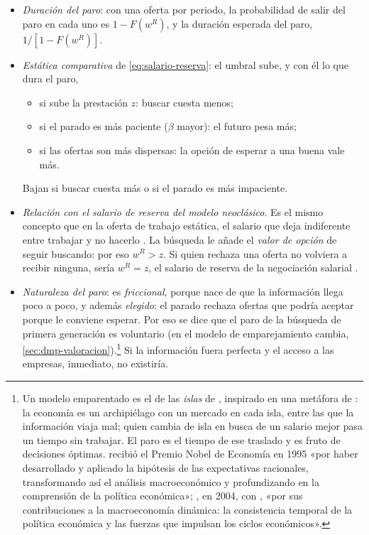 \documentclass[11pt]{article}
\begin{document}
\begin{itemize}
\item \emph{Duración del paro}: con una oferta por periodo, la probabilidad de salir del paro en cada uno es $1-F(w^R)$, y la duración esperada del paro, $1/[1-F(w^R)]$.
\item \emph{Estática comparativa} de \eqref{eq:salario-reserva}: el umbral sube, y con él lo que dura el paro,
  \begin{itemize}
  \item si sube la prestación $z$: buscar cuesta menos;
  \item si el parado es más paciente ($\beta$ mayor): el futuro pesa más;
  \item si las ofertas son más dispersas: la opción de esperar a una buena vale más.
  \end{itemize}
  Bajan si buscar cuesta más o si el parado es más impaciente.
\item \emph{Relación con el salario de reserva del modelo neoclásico}. Es el mismo concepto que en la oferta de trabajo estática, el salario que deja indiferente entre trabajar y no hacerlo . La búsqueda le añade el \emph{valor de opción} de seguir buscando: por eso $w^R>z$. Si quien rechaza una oferta no volviera a recibir ninguna, sería $w^R=z$, el salario de reserva de la negociación salarial .
\item \emph{Naturaleza del paro}: es \emph{friccional}, porque nace de que la información llega poco a poco, y además \emph{elegido}: el parado rechaza ofertas que podría aceptar porque le conviene esperar. Por eso se dice que el paro de la búsqueda de primera generación es voluntario (en el modelo de emparejamiento cambia, \ref{sec:dmp-valoracion}).\footnote{Un modelo emparentado es el de las \emph{islas} de \textcite{LucasPrescott1974Equilibrium}, inspirado en una metáfora de : la economía es un archipiélago con un mercado en cada isla, entre las que la información viaja mal; quien cambia de isla en busca de un salario mejor pasa un tiempo sin trabajar. El paro es el tiempo de ese traslado y es fruto de decisiones óptimas.  recibió el Premio Nobel de Economía en 1995 «por haber desarrollado y aplicado la hipótesis de las expectativas racionales, transformando así el análisis macroeconómico y profundizando en la comprensión de la política económica»\nocite{Nobel1995Lucas}; , en 2004, con , «por sus contribuciones a la macroeconomía dinámica: la consistencia temporal de la política económica y las fuerzas que impulsan los ciclos económicos»\nocite{Nobel2004KydlandPrescott}.} Si la información fuera perfecta y el acceso a las empresas, inmediato, no existiría.

\end{itemize}
\end{document}
